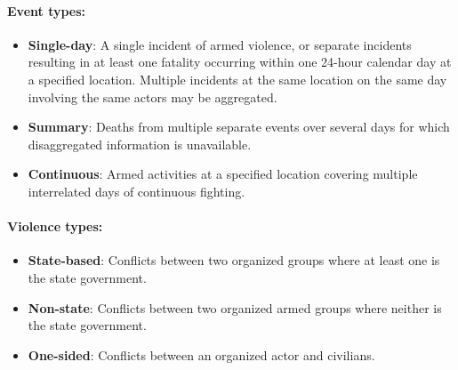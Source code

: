 \paragraph{Event types:}
\begin{itemize}
    \item \textbf{Single-day}: A single incident of armed violence, or
    separate incidents resulting in at least one fatality occurring within
    one 24-hour calendar day at a specified location. Multiple incidents at
    the same location on the same day involving the same actors may be
    aggregated.
    \item \textbf{Summary}: Deaths from multiple separate events over
    several days for which disaggregated information is unavailable.
    \item \textbf{Continuous}: Armed activities at a specified location
    covering multiple interrelated days of continuous fighting.
\end{itemize}

\paragraph{Violence types:}
\begin{itemize}
    \item \textbf{State-based}: Conflicts between two organized groups where
    at least one is the state government.
    \item \textbf{Non-state}: Conflicts between two organized armed groups
    where neither is the state government.
    \item \textbf{One-sided}: Conflicts between an organized actor and
    civilians.
\end{itemize}
